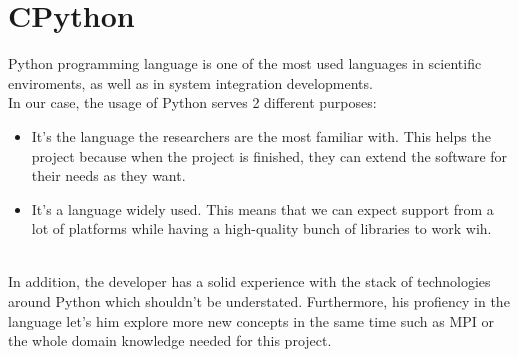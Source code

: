 \section{CPython}

Python\cite{Python} programming language is one of the most used languages
in scientific enviroments, as well as in system integration developments.\\

In our case, the usage of Python serves 2 different purposes:
\begin{itemize}
  \item It's the language the researchers are the most familiar with. This
  helps the project because when the project is finished, they can extend the
  software for their needs as they want.
  \item It's a language widely used. This means that we can expect support from
  a lot of platforms while having a high-quality bunch of libraries to work
  wih.
\end{itemize}\\


In addition, the developer has a solid experience with the stack of
technologies around Python which shouldn't be understated. Furthermore, his
profiency in the language let's him explore more new concepts in the same time
such as MPI or the whole domain knowledge needed for this project.\\ 
